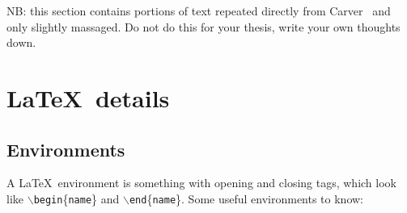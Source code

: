 \documentclass{uvamscse}
\newcommand{\cmd}[1]{\texttt{$\backslash$#1}}
\begin{document}
NB: this section contains portions of text repeated directly from Carver~\cite{Carver10} and
only slightly massaged. Do not do this for your thesis, write your own thoughts down.

\section{\LaTeX\ details}

\subsection{Environments}

A \LaTeX\ environment is something with opening and closing tags, which look
like \cmd{begin}\{\texttt{name}\} and \cmd{end}\{\texttt{name}\}. Some useful
environments to know:
\end{document}
